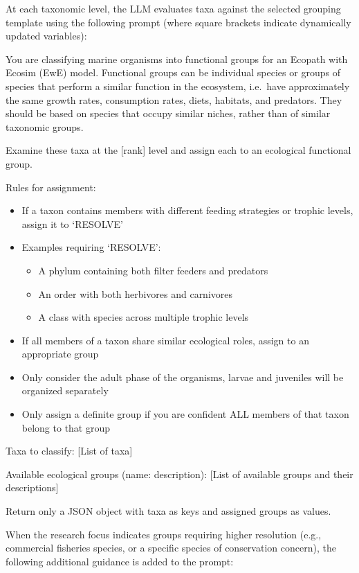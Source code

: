 At each taxonomic level, the LLM evaluates taxa against the selected grouping template using the following prompt (where square brackets indicate dynamically updated variables):

\begin{prompt}
You are classifying marine organisms into functional groups for an Ecopath with Ecosim (EwE) model. Functional groups can be individual species or groups of species that perform a similar function in the ecosystem, i.e.\ have approximately the same growth rates, consumption rates, diets, habitats, and predators. They should be based on species that occupy similar niches, rather than of similar taxonomic groups.

Examine these taxa at the [rank] level and assign each to an ecological functional group.

Rules for assignment:
\begin{itemize}
\item If a taxon contains members with different feeding strategies or trophic levels, assign it to `RESOLVE'
\item Examples requiring `RESOLVE':
  \begin{itemize}
  \item A phylum containing both filter feeders and predators
  \item An order with both herbivores and carnivores
  \item A class with species across multiple trophic levels
  \end{itemize}
\item If all members of a taxon share similar ecological roles, assign to an appropriate group
\item Only consider the adult phase of the organisms, larvae and juveniles will be organized separately
\item Only assign a definite group if you are confident ALL members of that taxon belong to that group
\end{itemize}

Taxa to classify:
[List of taxa]

Available ecological groups (name: description):
[List of available groups and their descriptions]

Return only a JSON object with taxa as keys and assigned groups as values.
\end{prompt}

When the research focus indicates groups requiring higher resolution (e.g., commercial fisheries species, or a specific species of conservation concern), the following additional guidance is added to the prompt:

